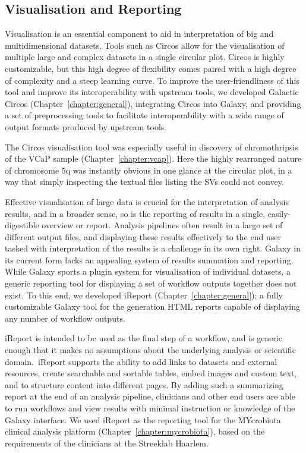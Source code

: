 \subsection{Visualisation and Reporting}
Visualisation is an essential component to aid in interpretation of big and multidimensional datasets. Tools such as Circos \cite{circos} allow for the visualisation of multiple large and complex datasets in a single circular plot. Circos is highly customizable, but this high degree of flexibility comes paired with a high degree of complexity and a steep learning curve. To improve the user-friendliness of this tool and improve its interoperability with upstream tools, we developed Galactic Circos (Chapter~\ref{chapter:general}), integrating Circos into Galaxy, and providing a set of preprocessing tools to facilitate interoperability with a wide range of output formats produced by upstream tools.

The Circos visualisation tool was especially useful in discovery of chromothripsis of the VCaP sample (Chapter~\ref{chapter:vcap}).
Here the highly rearranged nature of chromosome 5q was instantly obvious in one glance at the circular plot, in a way that simply inspecting the textual files listing the SVs could not convey.

Effective visualisation of large data is crucial for the interpretation of analysis results, and in a broader sense, so is the reporting of results in a single, easily-digestible overview or report. Analysis pipelines often result in a large set of different output files, and displaying these results effectively to the end user tasked with interpretation of the results is a challenge in its own right.
Galaxy in its current form lacks an appealing system of results summation and reporting. While Galaxy sports a plugin system for visualisation of individual datasets, a generic reporting tool for displaying a set of workflow outputs together does not exist. To this end, we developed iReport (Chapter~\ref{chapter:general}); a fully customizable Galaxy tool for the generation HTML reports capable of displaying any number of workflow outputs.\

iReport is intended to be used as the final step of a workflow, and is generic enough that it makes no assumptions about the underlying analysis or scientific domain.\ iReport supports  the ability to add links to datasets and external resources, create searchable and sortable tables, embed images and custom text, and to structure content into different pages.
By adding such a summarizing report at the end of an analysis pipeline, clinicians and other end users are able to run workflows and view results with minimal instruction or knowledge of the Galaxy interface.
We used iReport as the reporting tool for the MYcrobiota clinical analysis platform (Chapter~\ref{chapter:mycrobiota}), based on the requirements of the clinicians at the Streeklab Haarlem.

